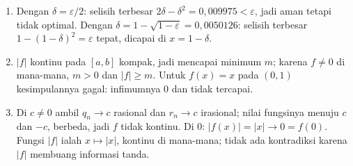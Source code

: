 \begin{enumerate}[label=\textbf{11.\arabic*}]
  \item Dengan $\delta=\varepsilon/2$: selisih terbesar
        $2\delta-\delta^{2}=0{,}009975<\varepsilon$, jadi aman tetapi tidak
        optimal. Dengan $\delta=1-\sqrt{1-\varepsilon}=0{,}0050126$: selisih
        terbesar $1-(1-\delta)^{2}=\varepsilon$ tepat, dicapai di
        $x=1-\delta$.

  \item $\lvert f\rvert$ kontinu pada $[a,b]$ kompak, jadi mencapai minimum $m$;
        karena $f\ne0$ di mana-mana, $m>0$ dan $\lvert f\rvert\ge m$. Untuk
        $f(x)=x$ pada $(0,1)$ kesimpulannya gagal: infimumnya $0$ dan tidak
        tercapai.

  \item Di $c\ne0$ ambil $q_{n}\to c$ rasional dan $r_{n}\to c$ irasional; nilai
        fungsinya menuju $c$ dan $-c$, berbeda, jadi $f$ tidak kontinu. Di $0$:
        $\lvert f(x)\rvert=\lvert x\rvert\to0=f(0)$. Fungsi $\lvert f\rvert$
        ialah $x\mapsto\lvert x\rvert$, kontinu di mana-mana; tidak ada
        kontradiksi karena $\lvert f\rvert$ membuang informasi tanda.
\end{enumerate}

